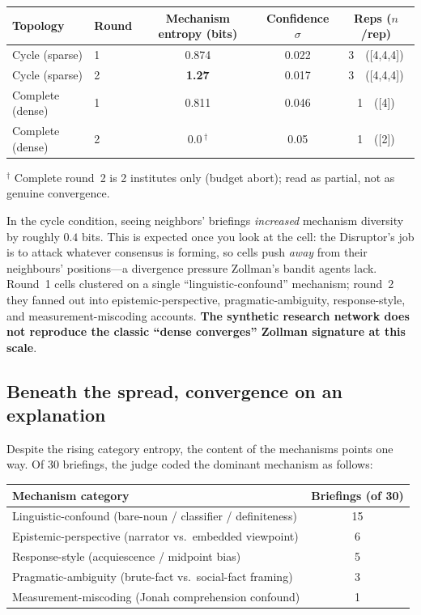 \documentclass[11pt]{article}
\begin{document}
\begin{center}
\small
\begin{tabular}{@{}llccc@{}}
\toprule
Topology & Round & Mechanism entropy (bits) & Confidence $\sigma$ & Reps ($n$/rep) \\
\midrule
Cycle (sparse)    & 1 & 0.874 & 0.022 & 3\ \ ([4,4,4]) \\
Cycle (sparse)    & 2 & \textbf{1.27} & 0.017 & 3\ \ ([4,4,4]) \\
Complete (dense)  & 1 & 0.811 & 0.046 & 1\ \ ([4]) \\
Complete (dense)  & 2 & 0.0\,$^{\dagger}$ & 0.05 & 1\ \ ([2]) \\
\bottomrule
\end{tabular}
\end{center}
\vspace{-2pt}
{\footnotesize $^{\dagger}$ Complete round~2 is 2 institutes only (budget abort); read as partial, not as genuine convergence.}

\medskip
In the cycle condition, seeing neighbors' briefings \emph{increased} mechanism diversity by roughly $0.4$ bits. This is expected once you look at the cell: the Disruptor's job is to attack whatever consensus is forming, so cells push \emph{away} from their neighbours' positions---a divergence pressure Zollman's bandit agents lack. Round~1 cells clustered on a single ``linguistic-confound'' mechanism; round~2 they fanned out into epistemic-perspective, pragmatic-ambiguity, response-style, and measurement-miscoding accounts. \textbf{The synthetic research network does not reproduce the classic ``dense converges'' Zollman signature at this scale}.

\subsection{Beneath the spread, convergence on an explanation}

Despite the rising category entropy, the content of the mechanisms points one way. Of 30 briefings, the judge coded the dominant mechanism as follows:

\begin{center}
\small
\begin{tabular}{@{}lc@{}}
\toprule
Mechanism category & Briefings (of 30) \\
\midrule
Linguistic-confound (bare-noun / classifier / definiteness) & 15 \\
Epistemic-perspective (narrator vs.\ embedded viewpoint) & 6 \\
Response-style (acquiescence / midpoint bias) & 5 \\
Pragmatic-ambiguity (brute-fact vs.\ social-fact framing) & 3 \\
Measurement-miscoding (Jonah comprehension confound) & 1 \\
\bottomrule
\end{tabular}
\end{center}
\end{document}
